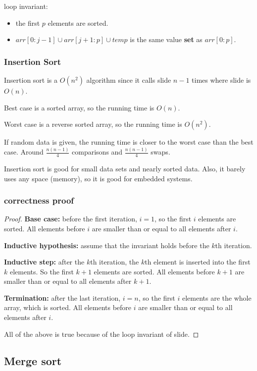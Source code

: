 \documentclass[letterpaper,12pt]{article}
\begin{document}
loop invariant:  \begin{itemize}
    \item the first $p$ elements are sorted.
    \item $arr[0:j-1]\cup arr[j+1:p] \cup temp$ is the same value \textbf{set} as $arr[0:p]$.
\end{itemize}
\subsubsection{Insertion Sort}
Insertion sort is a $O(n^2)$ algorithm since it calls slide $n-1$ times where slide is $O(n)$.

Best case is a sorted array, so the running time is $O(n)$.

Worst case is a reverse sorted array, so the running time is $O(n^2)$.

If random data is given, the running time is closer to the worst case than the best case. Around $\frac{n(n-1)}{4}$ comparisons and $\frac{n(n-1)}{4}$ swaps.

Insertion sort is good for small data sets and nearly sorted data. Also, it barely uses any space (memory), so it is good for embedded systems.

\subsubsection{correctness proof}
\begin{proof}
    \textbf{Base case:} before the first iteration, $i=1$, so the first $i$ elements are sorted. All elements before $i$ are smaller than or equal to all elements after $i$.

    \textbf{Inductive hypothesis:} assume that the invariant holds before the $k$th iteration.

    \textbf{Inductive step:} after the $k$th iteration, the $k$th element is inserted into the first $k$ elements. So the first $k+1$ elements are sorted. All elements before $k+1$ are smaller than or equal to all elements after $k+1$.

    \textbf{Termination:} after the last iteration, $i=n$, so the first $i$ elements are the whole array, which is sorted. All elements before $i$ are smaller than or equal to all elements after $i$.

    All of the above is true because of the loop invariant of slide.
\end{proof}

\subsection{Merge sort}
\end{document}

